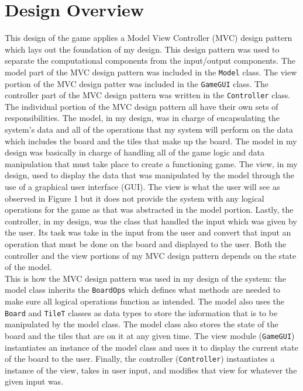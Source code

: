 \documentclass[12pt]{article}
\begin{document}
\section{Design Overview}
\hspace{\parindent}This design of the game applies a Model View Controller (MVC) design pattern  which lays out the foundation of my design. This design pattern was used to separate the computational components from the input/output components. The model part of the MVC design pattern was included in the
\verb|Model| class. The view portion of the MVC design patter was included in the \verb|GameGUI| class.
The controller part of the MVC design pattern was written in the \verb|Controller| class. The individual
portion of the MVC design pattern all have their own sets of responsibilities. The model, in my design, 
was in charge of encapsulating the system's data and all of the operations that my system will perform
on the data which includes the board and the tiles that make up the board. The model in my design was basically in charge of handling all of the game logic and data manipulation that must take place to create a functioning game. The view, in my design, used to display the data that was manipulated by the model through the use of a graphical user interface (GUI). The view is what the user will see as observed in Figure 1 but it does not provide the system with any logical operations for the game as that was abstracted in the model portion. Lastly, the controller, in my design, was the class that handled the input which was given by the user. Its task was take in the input from the user and convert that input an operation that must be done on the board and displayed to the user. Both the controller and the view portions of my MVC design pattern depends on the state of the model.\\
\hspace{\parindent}This is how the MVC design pattern was used in my design of the system: the model class inherits the \verb|BoardOps| which defines what methods are needed to make sure all logical operations function as intended. The model also uses the \verb|Board| and \verb|TileT| classes as data types to store the information that is to be manipulated by the model class. The model class also stores the state of the board and the tiles that are on it at any given time. The view module (\verb|GameGUI|) instantiates an instance of the model class and uses it to display the current state of the board to the user. Finally, the controller (\verb|Controller|) instantiates a instance of the view, takes in user input, and modifies that view for whatever the given input was.
\end{document}
